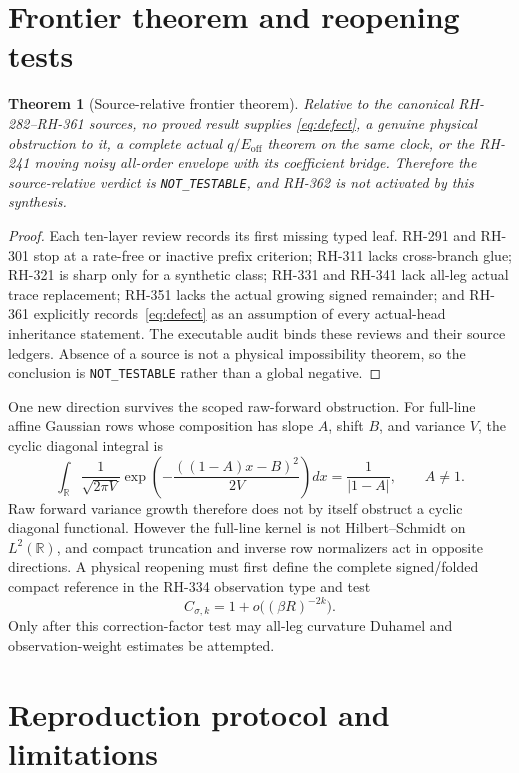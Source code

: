 \documentclass[11pt]{article}
\newtheorem{theorem}{Theorem}[section]
\theoremstyle{definition}
\theoremstyle{remark}
\newcommand{\Eoff}{E_{\mathrm{off}}}
\begin{document}
\section{Frontier theorem and reopening tests}

\begin{theorem}[Source-relative frontier theorem]\label{thm:frontier}
Relative to the canonical RH-282--RH-361 sources, no proved result supplies
\eqref{eq:defect}, a genuine physical obstruction to it, a complete actual
$q/\Eoff$ theorem on the same clock, or the RH-241 moving noisy all-order
envelope with its coefficient bridge.  Therefore the source-relative verdict
is \texttt{NOT\_TESTABLE}, and RH-362 is not activated by this synthesis.
\end{theorem}
\begin{proof}
Each ten-layer review records its first missing typed leaf.  RH-291 and
RH-301 stop at a rate-free or inactive prefix criterion; RH-311 lacks
cross-branch glue; RH-321 is sharp only for a synthetic class; RH-331 and
RH-341 lack all-leg actual trace replacement; RH-351 lacks the actual growing
signed remainder; and RH-361 explicitly records~\eqref{eq:defect} as an
assumption of every actual-head inheritance statement.  The executable audit
binds these reviews and their source ledgers.  Absence of a source is not a
physical impossibility theorem, so the conclusion is \texttt{NOT\_TESTABLE}
rather than a global negative.
\end{proof}

One new direction survives the scoped raw-forward obstruction.  For
full-line affine Gaussian rows whose composition has slope $A$, shift $B$,
and variance $V$, the cyclic diagonal integral is
\[
 \int_{\mathbb R}\frac{1}{\sqrt{2\pi V}}
 \exp\!\left(-\frac{((1-A)x-B)^2}{2V}\right)dx
 =\frac1{|1-A|},\qquad A\ne1.
\]
Raw forward variance growth therefore does not by itself obstruct a cyclic
diagonal functional.  However the full-line kernel is not Hilbert--Schmidt on
$L^2(\mathbb R)$, and compact truncation and inverse row normalizers act in
opposite directions.  A physical reopening must first define the complete
signed/folded compact reference in the RH-334 observation type and test
\[
 C_{\sigma,k}=1+o\bigl((\beta R)^{-2k}\bigr).
\]
Only after this correction-factor test may all-leg curvature Duhamel and
observation-weight estimates be attempted.

\section{Reproduction protocol and limitations}
\end{document}
